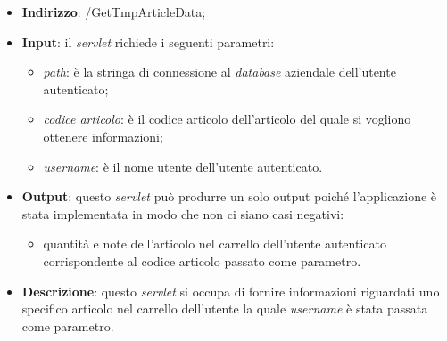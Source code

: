 
\begin{itemize}
	\item \textbf{Indirizzo}: /GetTmpArticleData;
	\item \textbf{Input}: il \textit{servlet} richiede i seguenti parametri:
		\begin{itemize}
			\item \textit{path}: è la stringa di connessione al \textit{database} aziendale dell'utente autenticato;
			\item \textit{codice articolo}: è il codice articolo dell'articolo del quale si vogliono ottenere informazioni;
			\item \textit{username}: è il nome utente dell'utente autenticato.
		\end{itemize}
	\item \textbf{Output}: questo \textit{servlet} può produrre un solo output poiché l'applicazione è stata implementata in modo che non ci siano casi negativi:
		\begin{itemize}
			\item quantità e note dell'articolo nel carrello dell'utente autenticato corrispondente al codice articolo passato come parametro.
		\end{itemize}
	\item \textbf{Descrizione}: questo \textit{servlet} si occupa di fornire informazioni riguardati uno specifico articolo nel carrello dell'utente la quale \textit{username} è stata passata come parametro.
\end{itemize}


